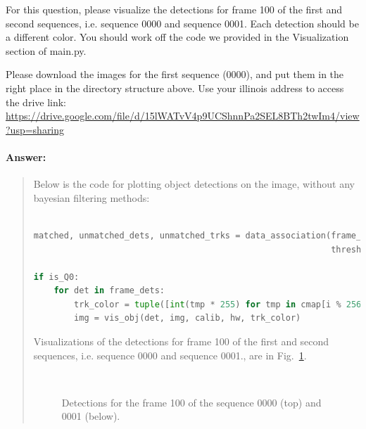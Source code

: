 \documentclass[11pt]{article}
\begin{document}
For this question, please visualize the detections for frame 100 of the first and second sequences, i.e. sequence 0000 and sequence 0001. Each detection should be a different color. You should work off the code we provided in the Visualization section of main.py.

Please download the images for the first sequence (0000), and put them in the right place in the directory structure above. Use your illinois address to access the drive link: \url{https://drive.google.com/file/d/15lWATvV4p9UCShnnPa2SEL8BTh2twIm4/view?usp=sharing}
\paragraph{Answer:} 
\begin{quote}

Below is the code for plotting object detections on the image, without any bayesian filtering methods:

\begin{lstlisting}[language=Python, basicstyle=\scriptsize]

matched, unmatched_dets, unmatched_trks = data_association(frame_dets, trks_bbox, 
                                                           threshold=-0.2, algm=algm)

if is_Q0:
    for det in frame_dets:
        trk_color = tuple([int(tmp * 255) for tmp in cmap[i % 256][:3]])
        img = vis_obj(det, img, calib, hw, trk_color)

\end{lstlisting}

Visualizations of the detections for frame 100 of the first and second sequences, i.e. sequence 0000 and sequence 0001., are in Fig.~\ref{fig:q0}.

\begin{figure}[h]
    \centering
     \\
    \caption{Detections for the frame 100 of the sequence 0000 (top) and 0001 (below).}
    \label{fig:q0}
\end{figure}

\end{quote}
\end{document}
